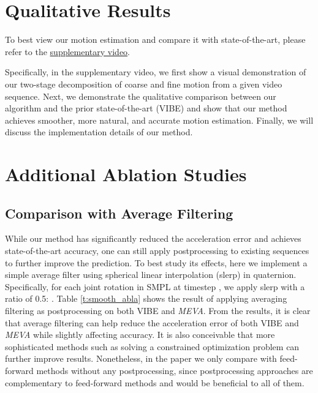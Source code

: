 \documentclass[runningheads]{llncs}
\begin{document}
\section{Qualitative Results}
To best view our motion estimation and compare it with state-of-the-art, please refer to the \href{https://youtu.be/YBb9NDz3ngM}{supplementary video}.


Specifically, in the supplementary video, we first show a visual demonstration of our two-stage decomposition of coarse and fine motion from a given video sequence. Next, we demonstrate the qualitative comparison between our algorithm and the prior state-of-the-art (VIBE\cite{vibe}) and show that our method achieves smoother, more natural, and accurate motion estimation.
Finally, we will discuss the implementation details of our method.

\section{Additional Ablation Studies}

\subsection{Comparison with Average Filtering}
 While our method has significantly reduced the acceleration error and achieves state-of-the-art accuracy, one can still apply postprocessing to existing sequences to further improve the prediction. To best study its effects, here we implement a simple average filter using spherical linear interpolation (slerp) in quaternion. Specifically, for each joint rotation in SMPL  at timestep , we apply slerp with a ratio of 0.5:  . Table \ref{t:smooth_abla} shows the result of applying averaging filtering as postprocessing on both VIBE \cite{vibe} and \textit{MEVA}. From the results, it is clear that average filtering can help reduce the acceleration error of both VIBE and \textit{MEVA} while slightly affecting accuracy. It is also conceivable that more sophisticated methods such as solving a constrained optimization problem \cite{Huang,Peng2018,Mehta2017} can further improve results. Nonetheless, in the paper we only compare with feed-forward methods without any postprocessing, since postprocessing approaches are complementary to feed-forward methods and would be beneficial to all of them. 
\end{document}
